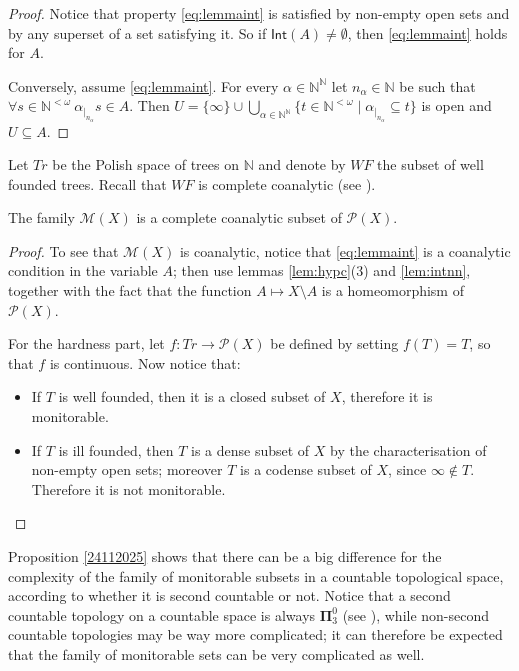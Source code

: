 \documentclass{lmcs}
\newcommand{\N}{\mathbb N}
\newcommand{\Bai}{\N^{\N}}
\newcommand{\Seq}{\N^{<\omega}}
\newcommand{\bpi}{\boldsymbol\Pi}
\newcommand{\Int}[1]{\mathsf{Int}(#1)}
\begin{document}
\begin{proof}
Notice that property \eqref{eq:lemmaint} is satisfied by non-empty open sets and by any superset of a set satisfying it.
So if $ \Int{A} \ne\emptyset $, then \eqref{eq:lemmaint} holds for $A$.

Conversely, assume \eqref{eq:lemmaint}.
For every $\alpha\in \Bai $ let $n_{\alpha }\in \N $ be such that $\forall s\in \Seq\ \alpha_{|_{n_{\alpha }}}s\in A$.
Then $U=\{\infty\}\cup\bigcup_{\alpha\in \Bai }\{ t\in \Seq \mid \alpha_{|_{n_{\alpha }}}\subseteq t\}$ is open and $U\subseteq A$.
\end{proof}

Let $Tr$ be the Polish space of trees on $ \N $ and denote by $WF$ the subset of well founded trees.
Recall that $WF$ is complete coanalytic (see \cite[\S 33.A]{Kechris1995}).

\begin{prop} \label{24112025}
The family $ \mathcal M (X)$ is a complete coanalytic subset of $ \mathcal P (X)$.
\end{prop}

\begin{proof}
To see that $ \mathcal M (X)$ is coanalytic, notice that \eqref{eq:lemmaint} is a coanalytic condition in the variable $A$; then use lemmas \ref{lem:hypc}(3) and \ref{lem:intnn}, together with the fact that the function $A\mapsto X\setminus A$ is a homeomorphism of $ \mathcal P (X)$.

For the hardness part, let $f:Tr\to \mathcal P (X)$ be defined by setting $f(T)=T$, so that $f$ is continuous.
Now notice that:
\begin{itemize}
\item If $T$ is well founded, then it is a closed subset of $X$, therefore it is monitorable.
\item If $T$ is ill founded, then $T$ is a dense subset of $X$ by the characterisation of non-empty open sets; moreover $T$ is a codense subset of $X$, since $\infty\notin T$.
Therefore it is not monitorable.
\end{itemize}
\end{proof}

Proposition \ref{24112025} shows that there can be a big difference for the complexity of the family of monitorable subsets in a countable topological space, according to whether it is second countable or not.
Notice that a second countable topology on a countable space is always $ \bpi^0_3$ (see \cite[proposition 3.2(ii)]{Todorc2014}), while non-second countable topologies may be way more complicated; it can therefore be expected that the family of monitorable sets can be very complicated as well.











 
\end{document}
